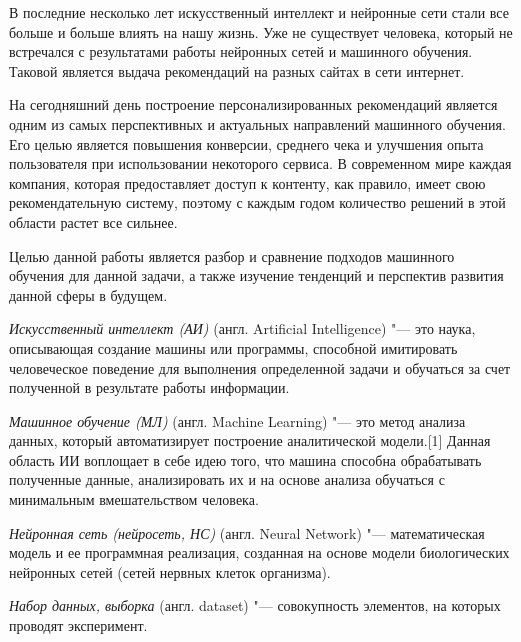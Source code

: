 \documentclass[bachelor, och, coursework]{SCWorks}
\begin{document}

\tableofcontents

\intro

    В последние несколько лет искусственный интеллект и нейронные сети стали все
    больше и больше влиять на нашу жизнь. Уже не существует человека, который
    не встречался с результатами работы нейронных сетей и машинного обучения.
    Таковой является выдача рекомендаций на разных сайтах в сети интернет.

    На сегодняшний день построение персонализированных рекомендаций является
    одним из самых перспективных и актуальных направлений машинного обучения.
    Его целью является повышения конверсии, среднего чека и улучшения опыта
    пользователя при использовании некоторого сервиса. В современном мире
    каждая компания, которая предоставляет доступ к контенту, как правило,
    имеет свою рекомендательную систему, поэтому с каждым годом количество
    решений в этой области растет все сильнее.

    Целью данной работы является разбор и сравнение подходов машинного
    обучения для данной задачи, а также изучение тенденций и перспектив развития 
    данной сферы в будущем.


\textit{Искусственный интеллект (АИ)} (англ. Artificial Intelligence) "--- это наука, описывающая создание машины или программы,
способной имитировать человеческое поведение для выполнения определенной задачи и обучаться
за счет полученной в результате работы информации.

\textit{Машинное обучение (МЛ)} (англ. Machine Learning) "--- это метод анализа данных, который автоматизирует построение аналитической 
модели.[1] Данная область ИИ воплощает в себе идею того, что машина способна обрабатывать полученные данные, анализировать их 
и на основе анализа обучаться с минимальным вмешательством человека.

\textit{Нейронная сеть (нейросеть, НС)}  (англ. Neural Network) "--- математическая модель и ее программная реализация, созданная
на основе модели биологических нейронных сетей (сетей нервных клеток организма).

\textit{Набор данных, выборка} (англ. dataset) "--- совокупность элементов, на которых проводят эксперимент.
\end{document}
